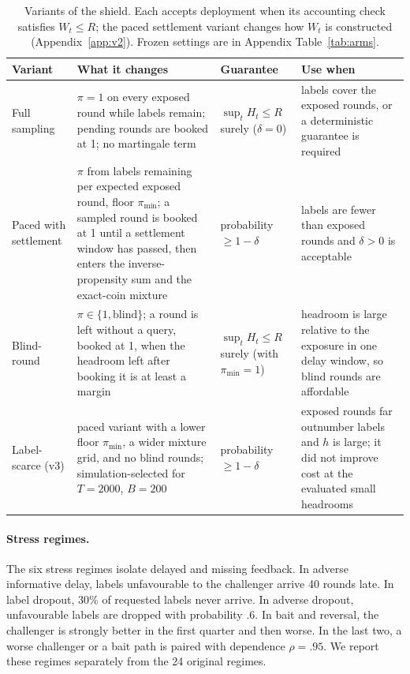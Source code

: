 \documentclass[10pt]{article}
\theoremstyle{plain}
\theoremstyle{definition}
\begin{document}
\begin{table}[!htbp]
\caption{Variants of the shield. Each accepts deployment when its accounting check satisfies $W_t\le R$; the paced settlement variant changes how $W_t$ is constructed (Appendix~\ref{app:v2}). Frozen settings are in Appendix Table~\ref{tab:arms}.}\label{tab:variants}
\centering\small
\begin{tabular}{@{}>{\raggedright\arraybackslash}p{2.5cm} >{\raggedright\arraybackslash}p{5.3cm} >{\raggedright\arraybackslash}p{2.6cm} >{\raggedright\arraybackslash}p{3.9cm}@{}}
\toprule
Variant & What it changes & Guarantee & Use when \\
\midrule
Full sampling & $\pi=1$ on every exposed round while labels remain; pending rounds are booked at 1; no martingale term & $\sup_tH_t\le R$ surely ($\delta=0$) & labels cover the exposed rounds, or a deterministic guarantee is required \\
Paced with settlement & $\pi$ from labels remaining per expected exposed round, floor $\pi_{\min}$; a sampled round is booked at 1 until a settlement window has passed, then enters the inverse-propensity sum and the exact-coin mixture & probability $\ge1-\delta$ & labels are fewer than exposed rounds and $\delta>0$ is acceptable \\
Blind-round & $\pi\in\{1,\text{blind}\}$; a round is left without a query, booked at 1, when the headroom left after booking it is at least a margin & $\sup_tH_t\le R$ surely (with $\pi_{\min}=1$) & headroom is large relative to the exposure in one delay window, so blind rounds are affordable \\
Label-scarce (v3) & paced variant with a lower floor $\pi_{\min}$, a wider mixture grid, and no blind rounds; simulation-selected for $T=2000$, $B=200$ & probability $\ge1-\delta$ & exposed rounds far outnumber labels and $h$ is large; it did not improve cost at the evaluated small headrooms \\
\bottomrule
\end{tabular}
\end{table}

\paragraph{Stress regimes.}
The six stress regimes isolate delayed and missing feedback. In adverse informative delay, labels unfavourable to the challenger arrive 40 rounds late. In label dropout, $30\%$ of requested labels never arrive. In adverse dropout, unfavourable labels are dropped with probability $.6$. In bait and reversal, the challenger is strongly better in the first quarter and then worse. In the last two, a worse challenger or a bait path is paired with dependence $\rho=.95$. We report these regimes separately from the 24 original regimes.
\end{document}
